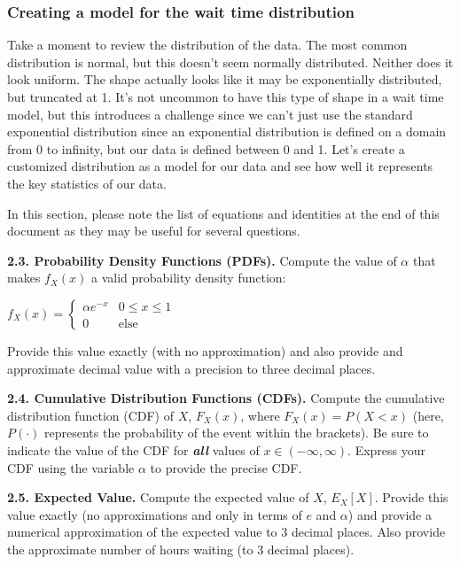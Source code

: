 \documentclass[
  letterpaper,
  DIV=11,
  numbers=noendperiod]{scrartcl}
\begin{document}
\subsubsection{Creating a model for the wait time
distribution}\label{creating-a-model-for-the-wait-time-distribution}

Take a moment to review the distribution of the data. The most common
distribution is normal, but this doesn't seem normally distributed.
Neither does it look uniform. The shape actually looks like it may be
exponentially distributed, but truncated at 1. It's not uncommon to have
this type of shape in a wait time model, but this introduces a challenge
since we can't just use the standard exponential distribution since an
exponential distribution is defined on a domain from 0 to infinity, but
our data is defined between 0 and 1. Let's create a customized
distribution as a model for our data and see how well it represents the
key statistics of our data.

In this section, please note the list of equations and identities at the
end of this document as they may be useful for several questions.

\textbf{2.3. Probability Density Functions (PDFs).} Compute the value of
\(\alpha\) that makes \(f_X(x)\) a valid probability density function:

\(f_X(x) = \begin{cases}
                \alpha e^{-x}  & 0 \leq x \leq 1 \\
                0           & \text{else}
            \end{cases}\)

Provide this value exactly (with no approximation) and also provide and
approximate decimal value with a precision to three decimal places.

\textbf{2.4. Cumulative Distribution Functions (CDFs).} Compute the
cumulative distribution function (CDF) of \(X\), \(F_X(x)\), where
\(F_X(x)=P(X<x)\) (here, \(P(\cdot)\) represents the probability of the
event within the brackets). Be sure to indicate the value of the CDF for
\textbf{\emph{all}} values of \(x\in(-\infty,\infty)\). Express your CDF
using the variable \(\alpha\) to provide the precise CDF.

\textbf{2.5. Expected Value.} Compute the expected value of \(X\),
\(E_X[X]\). Provide this value exactly (no approximations and only in
terms of \(e\) and \(\alpha\)) and provide a numerical approximation of
the expected value to 3 decimal places. Also provide the approximate
number of hours waiting (to 3 decimal places).
\end{document}
